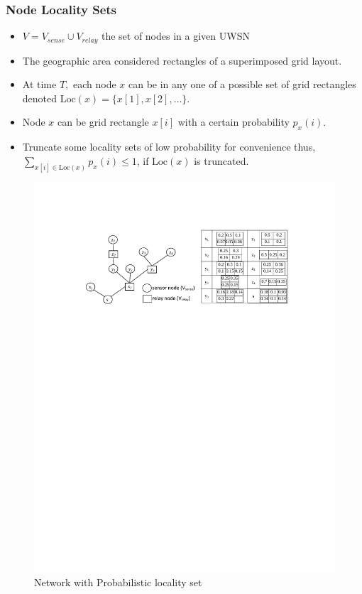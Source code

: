 \documentclass{beamer}
\newcommand{\loc}   	{ {\mathrm {Loc}} }
\begin{document}

\begin{frame}
\frametitle{Node Locality Sets}
\begin{itemize}
\item  $V=V_{sense}\cup V_{relay}$ the set of nodes in a given UWSN
\item The geographic area considered rectangles of a superimposed grid layout.
%
\item At time $T,$ each node $x$ can be in any one of a possible
set of grid rectangles denoted $\loc(x)= \{ x[1], x[2], \ldots \}$.

\item Node $x$ can be grid rectangle $x[i]$ with a certain probability $p_x(i)$. 
\item Truncate some locality sets of low probability for convenience thus, $\sum_{x[i] \in \loc(x)} p_x(i) \leq 1$, if $\loc(x)$ is truncated.
\end{itemize}

\begin{figure}
\includegraphics[width=4 in, height=1 in]{LocalitySet.pdf}
\caption{Network with Probabilistic locality set}
\end{figure}
\end{frame}
\end{document}
